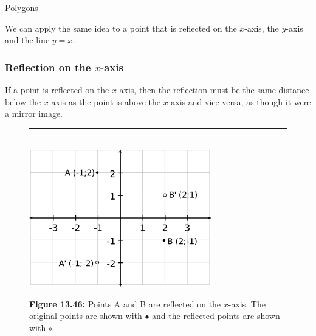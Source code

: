 \begin{exercises}{Polygons}
\begin{figure}[H]
\begin{center}
      \vspace{2pt}
    \vspace{.1in}
    
    \end{center}

 \end{figure}   

    \addtocounter{footnote}{-0}
    
        \par 
        \label{m39358*id71197}We can apply the same idea to a point that is reflected on the $x$-axis, the $y$-axis and the line $y=x$.\par 
        \label{m39358*uid7354}
            \subsubsection{ Reflection on the $x$-axis}
            \nopagebreak
            
          
          \label{m39358*id71251}If a point is reflected on the $x$-axis, then the reflection must be the same distance below the $x$-axis as the point is above the $x$-axis and vice-versa, as though it were a mirror image.\par 
          
    \setcounter{subfigure}{0}


	\begin{figure}[H] %
    \begin{center}
    \rule[.1in]{\figurerulewidth}{.005in} \\
        \label{m39358*uid7432!!!underscore!!!media}\label{m39358*uid74!!!underscore!!!printimage}\includegraphics[width=300px]{col11306.imgs/m39358_MG10C14_027.png} %
        
      \vspace{2pt}
    \vspace{\rubberspace}\par \begin{cnxcaption}
	  \small \textbf{Figure 13.46: }Points A and B are reflected on the $x$-axis. The original points are shown with $\ensuremath{\bullet}$ and the reflected points are shown with $\circ $.
	\end{cnxcaption}
      

\end{center}
\end{figure}
\end{exercises}
